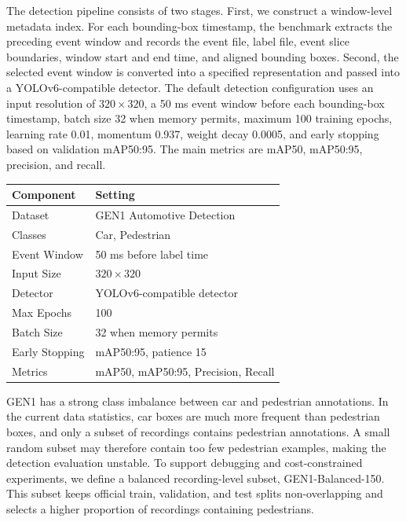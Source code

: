\documentclass[letterpaper]{article}
\begin{document}
The detection pipeline consists of two stages. First, we construct a window-level metadata index. For each bounding-box timestamp, the benchmark extracts the preceding event window and records the event file, label file, event slice boundaries, window start and end time, and aligned bounding boxes. Second, the selected event window is converted into a specified representation and passed into a YOLOv6-compatible detector. The default detection configuration uses an input resolution of $320\times320$, a 50 ms event window before each bounding-box timestamp, batch size 32 when memory permits, maximum 100 training epochs, learning rate 0.01, momentum 0.937, weight decay 0.0005, and early stopping based on validation mAP50:95. The main metrics are mAP50, mAP50:95, precision, and recall.

\begin{center}
\begin{footnotesize}
\setlength{\tabcolsep}{3pt}
\begin{tabular}{p{0.85in}|p{1.55in}}
Component & Setting \\
\hline
Dataset & GEN1 Automotive Detection \\
Classes & Car, Pedestrian \\
Event Window & 50 ms before label time \\
Input Size & $320\times320$ \\
Detector & YOLOv6-compatible detector \\
Max Epochs & 100 \\
Batch Size & 32 when memory permits \\
Early Stopping & mAP50:95, patience 15 \\
Metrics & mAP50, mAP50:95, Precision, Recall \\
\end{tabular}
\end{footnotesize}
\label{tab:gen1protocol}
\end{center}

GEN1 has a strong class imbalance between car and pedestrian annotations. In the current data statistics, car boxes are much more frequent than pedestrian boxes, and only a subset of recordings contains pedestrian annotations. A small random subset may therefore contain too few pedestrian examples, making the detection evaluation unstable. To support debugging and cost-constrained experiments, we define a balanced recording-level subset, GEN1-Balanced-150. This subset keeps official train, validation, and test splits non-overlapping and selects a higher proportion of recordings containing pedestrians.
\end{document}
